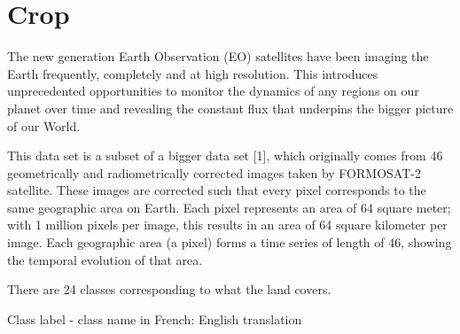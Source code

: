 \chapter{Crop}
\hypertarget{md_external_2data_2UCRArchive__2018_2Crop_2README}{}\label{md_external_2data_2UCRArchive__2018_2Crop_2README}
\label{md_external_2data_2UCRArchive__2018_2Crop_2README_autotoc_md40}%
%
 The new generation Earth Observation (EO) satellites have been imaging the Earth frequently, completely and at high resolution. This introduces unprecedented opportunities to monitor the dynamics of any regions on our planet over time and revealing the constant flux that underpins the bigger picture of our World.

This data set is a subset of a bigger data set \mbox{[}1\mbox{]}, which originally comes from 46 geometrically and radiometrically corrected images taken by FORMOSAT-\/2 satellite. These images are corrected such that every pixel corresponds to the same geographic area on Earth. Each pixel represents an area of 64 square meter; with 1 million pixels per image, this results in an area of 64 square kilometer per image. Each geographic area (a pixel) forms a time series of length of 46, showing the temporal evolution of that area.

There are 24 classes corresponding to what the land covers.

Class label -\/ class name in French\+: English translation


